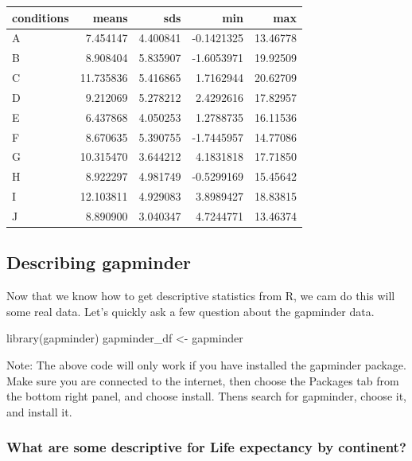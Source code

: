 \documentclass[
]{book}
\newenvironment{Shaded}{\begin{snugshade}}{\end{snugshade}}
\newcommand{\FunctionTok}[1]{\textcolor[rgb]{0.00,0.00,0.00}{#1}}
\newcommand{\NormalTok}[1]{#1}
\newcommand{\OtherTok}[1]{\textcolor[rgb]{0.56,0.35,0.01}{#1}}
\begin{document}
\begin{tabular}{l|r|r|r|r}
\hline
conditions & means & sds & min & max\\
\hline
A & 7.454147 & 4.400841 & -0.1421325 & 13.46778\\
\hline
B & 8.908404 & 5.835907 & -1.6053971 & 19.92509\\
\hline
C & 11.735836 & 5.416865 & 1.7162944 & 20.62709\\
\hline
D & 9.212069 & 5.278212 & 2.4292616 & 17.82957\\
\hline
E & 6.437868 & 4.050253 & 1.2788735 & 16.11536\\
\hline
F & 8.670635 & 5.390755 & -1.7445957 & 14.77086\\
\hline
G & 10.315470 & 3.644212 & 4.1831818 & 17.71850\\
\hline
H & 8.922297 & 4.981749 & -0.5299169 & 15.45642\\
\hline
I & 12.103811 & 4.929083 & 3.8989427 & 18.83815\\
\hline
J & 8.890900 & 3.040347 & 4.7244771 & 13.46374\\
\hline
\end{tabular}

\hypertarget{describing-gapminder}{%
\subsection{Describing gapminder}\label{describing-gapminder}}

Now that we know how to get descriptive statistics from R, we cam do this will some real data. Let's quickly ask a few question about the gapminder data.

\begin{Shaded}
\begin{Highlighting}[]
\FunctionTok{library}\NormalTok{(gapminder)}
\NormalTok{gapminder\_df }\OtherTok{\textless{}{-}}\NormalTok{ gapminder}
\end{Highlighting}
\end{Shaded}

Note: The above code will only work if you have installed the gapminder package. Make sure you are connected to the internet, then choose the Packages tab from the bottom right panel, and choose install. Thens search for gapminder, choose it, and install it.

\hypertarget{what-are-some-descriptive-for-life-expectancy-by-continent}{%
\subsubsection{What are some descriptive for Life expectancy by continent?}\label{what-are-some-descriptive-for-life-expectancy-by-continent}}
\end{document}
